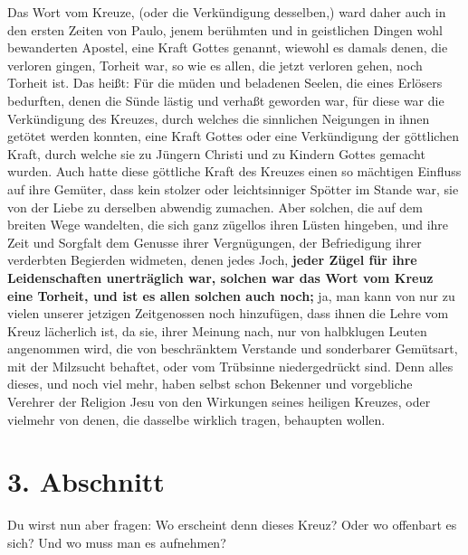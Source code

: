Das Wort vom Kreuze, (oder die Verkündigung desselben,) ward daher auch in den
ersten Zeiten von Paulo, jenem berühmten und in geistlichen Dingen wohl
bewanderten Apostel, eine Kraft Gottes genannt, wiewohl es damals denen, die
verloren gingen, Torheit war, so wie es allen, die jetzt verloren gehen, noch
Torheit ist. Das heißt: Für die müden und beladenen Seelen, die eines Erlösers
bedurften, denen die Sünde lästig und verhaßt geworden war, für diese war die
Verkündigung des Kreuzes, durch welches die sinnlichen Neigungen in ihnen
getötet werden konnten, eine Kraft Gottes oder eine Verkündigung der göttlichen
Kraft, durch welche sie zu Jüngern Christi und zu Kindern Gottes gemacht wurden.
Auch hatte diese göttliche Kraft des Kreuzes einen so mächtigen Einfluss auf ihre
Gemüter, dass kein stolzer oder leichtsinniger Spötter im Stande war, sie von
der Liebe zu derselben abwendig zumachen. Aber solchen, die auf dem breiten Wege
wandelten, die sich ganz zügellos ihren Lüsten hingeben, und ihre Zeit und
Sorgfalt dem Genusse ihrer Vergnügungen, der Befriedigung ihrer verderbten
Begierden widmeten, denen jedes Joch, \label{ref:03_02_leidenschaft}
\textbf{jeder Zügel für ihre Leidenschaften
unerträglich war, solchen war das Wort vom Kreuz eine Torheit, und ist es
allen solchen auch noch;} ja, man kann von nur zu vielen unserer jetzigen
Zeitgenossen noch hinzufügen, dass ihnen die Lehre vom Kreuz lächerlich ist, da
sie, ihrer Meinung nach, nur von halbklugen Leuten angenommen wird, die von
beschränktem Verstande und sonderbarer Gemütsart, mit der Milzsucht
 behaftet,
oder vom Trübsinne niedergedrückt sind. Denn alles dieses, und noch viel mehr,
haben selbst schon Bekenner und vorgebliche Verehrer der Religion Jesu von den
Wirkungen seines heiligen Kreuzes, oder vielmehr von denen, die dasselbe
wirklich tragen, behaupten wollen.

\section{3. Abschnitt} \label{kap3_ab3}

Du wirst nun aber fragen: Wo erscheint denn dieses Kreuz? Oder wo offenbart es
sich? Und wo muss man es aufnehmen?

\medskip

